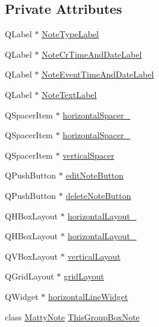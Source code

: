 \subsection*{Private Attributes}
\begin{DoxyCompactItemize}
\item 
Q\+Label $\ast$ \hyperlink{class_matty_group_box_a7bd564ef71ea2331a316d2fc6792ef09}{Note\+Type\+Label}
\item 
Q\+Label $\ast$ \hyperlink{class_matty_group_box_a1a71503d5ede703b934e4f02d932a038}{Note\+Cr\+Time\+And\+Date\+Label}
\item 
Q\+Label $\ast$ \hyperlink{class_matty_group_box_a97b192413385021b01b34db7493f8b49}{Note\+Event\+Time\+And\+Date\+Label}
\item 
Q\+Label $\ast$ \hyperlink{class_matty_group_box_a2243d04d95c060e516fa3a43f09f19ef}{Note\+Text\+Label}
\item 
Q\+Spacer\+Item $\ast$ \hyperlink{class_matty_group_box_a6b2678b09a3c56c18f357775e83b76c0}{horizontal\+Spacer\+\_}
\item 
Q\+Spacer\+Item $\ast$ \hyperlink{class_matty_group_box_a633d989baf5de2db6d0c01702ba6b410}{horizontal\+Spacer\+\_}
\item 
Q\+Spacer\+Item $\ast$ \hyperlink{class_matty_group_box_ae622d8330b00272995af1d41ce037b4c}{vertical\+Spacer}
\item 
Q\+Push\+Button $\ast$ \hyperlink{class_matty_group_box_a3237eef2287c1b2fcff14d226ef9116d}{edit\+Note\+Button}
\item 
Q\+Push\+Button $\ast$ \hyperlink{class_matty_group_box_ab51a570cfe8b06f8ae06a7163fb09d4f}{delete\+Note\+Button}
\item 
Q\+H\+Box\+Layout $\ast$ \hyperlink{class_matty_group_box_a5d52dd2e01ba1a5d155e056ea438f142}{horizontal\+Layout\+\_}
\item 
Q\+H\+Box\+Layout $\ast$ \hyperlink{class_matty_group_box_a053f7794bcd10214414d41e9c09663e0}{horizontal\+Layout\+\_}
\item 
Q\+V\+Box\+Layout $\ast$ \hyperlink{class_matty_group_box_a2fc280283ef68a61828fe26007c949f1}{vertical\+Layout}
\item 
Q\+Grid\+Layout $\ast$ \hyperlink{class_matty_group_box_a02436c3690d2007eb0cba523bcb668ea}{grid\+Layout}
\item 
Q\+Widget $\ast$ \hyperlink{class_matty_group_box_a34f61735914e5235c4bf58841e647f06}{horizontal\+Line\+Widget}
\item 
class \hyperlink{class_matty_note}{Matty\+Note} \hyperlink{class_matty_group_box_a00ca2ef39a0b5aca9e83373777bed395}{This\+Group\+Box\+Note}
\end{DoxyCompactItemize}


